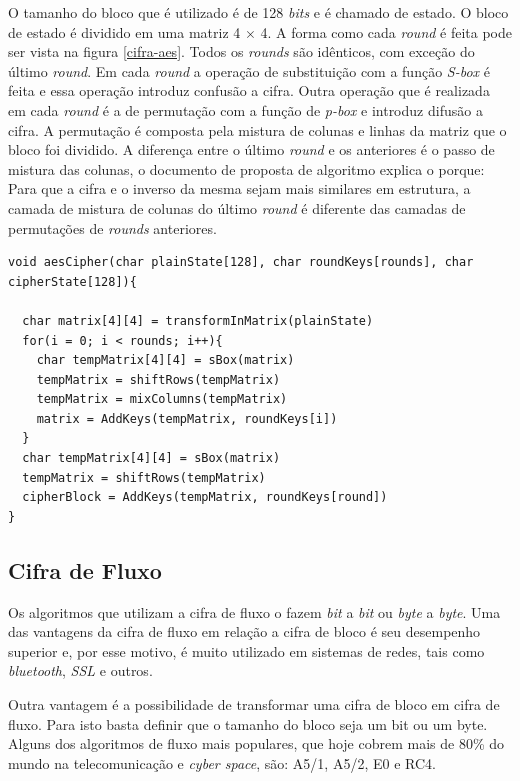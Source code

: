 O tamanho do bloco que é utilizado é de 128 \textit{bits} e é chamado de estado. O bloco de estado é dividido em uma matriz 4 $\times$ 4. A forma como cada \textit{round} é feita pode ser vista na figura \ref{cifra-aes}. Todos os \textit{rounds} são idênticos, com exceção do último \textit{round}. Em cada \textit{round} a operação de substituição com a função \textit{S-box} é feita e essa operação introduz confusão a cifra. Outra operação que é realizada em cada \textit{round} é a de permutação com a função de \textit{p-box} e introduz difusão a cifra. A permutação é composta pela mistura de colunas e linhas da matriz que o bloco foi dividido. A diferença entre o último \textit{round} e os anteriores é o passo de mistura das colunas, o documento de proposta de algoritmo explica o porque: Para que a cifra e o inverso da mesma sejam mais similares em estrutura, a camada de mistura de colunas do último \textit{round} é diferente das camadas de permutações de \textit{rounds} anteriores.\cite{aes-proposal}

    \begin{lstlisting}[caption={Pseudo-código AES}, label=aes-pseudo-code]
void aesCipher(char plainState[128], char roundKeys[rounds], char cipherState[128]){

  char matrix[4][4] = transformInMatrix(plainState)
  for(i = 0; i < rounds; i++){
	char tempMatrix[4][4] = sBox(matrix)   
	tempMatrix = shiftRows(tempMatrix) 
	tempMatrix = mixColumns(tempMatrix)
	matrix = AddKeys(tempMatrix, roundKeys[i])
  }
  char tempMatrix[4][4] = sBox(matrix)
  tempMatrix = shiftRows(tempMatrix)
  cipherBlock = AddKeys(tempMatrix, roundKeys[round])
}
    \end{lstlisting}

\subsection{Cifra de Fluxo}
\label{stream-cipher}

Os algoritmos que utilizam a cifra de fluxo o fazem \textit{bit} a \textit{bit} ou \textit{byte} a \textit{byte}. Uma das vantagens da cifra de fluxo em relação a cifra de bloco é seu desempenho superior e, por esse motivo, é muito utilizado em sistemas de redes, tais como \textit{bluetooth}, \textit{SSL} e outros. 

Outra vantagem é a possibilidade de transformar uma cifra de bloco em cifra de fluxo. Para isto basta definir que o tamanho do bloco seja um bit ou um byte. Alguns dos algoritmos de fluxo mais populares, que hoje cobrem mais de 80\% do mundo na telecomunicação e \textit{cyber space}, são: A5/1, A5/2, E0 e RC4. ~\cite{majid-mohd}


